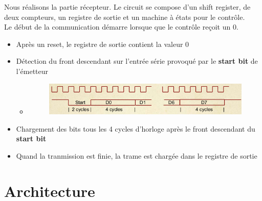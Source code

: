 \documentclass[a4paper]{article} %
\begin{document}


\begin{tcolorbox}[colframe=Monokaimagenta,colback=white]
Nous réalisons la partie récepteur. Le circuit se compose d'un shift register, de deux compteurs, un registre de sortie et un machine à états pour le contrôle.\\
Le début de la communication démarre lorsque que le contrôle reçoit un $0$.

\begin{itemize}
    \item    Après un reset, le registre de sortie contient la valeur $0$
    \item    Détection du front descendant sur l'entrée série provoqué par le \textbf{start bit} de l'émetteur
        \begin{itemize}
            \item    \begin{figure}[H]
                        \centering
                        \includegraphics[width=.8\textwidth]{src/chrono_emetteur.jpg}
                     \label{fig:trame}
                \end{figure}
        \end{itemize}
    \item    Chargement des bits tous les 4 cycles d'horloge après le front descendant du \textbf{start bit}
    \item    Quand la tranmission est finie, la trame est chargée dans le registre de sortie
    
\end{itemize}   
\end{tcolorbox}

\section{Architecture}
\end{document}

